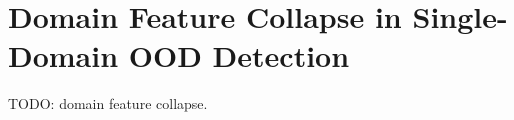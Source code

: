 \chapter{Domain Feature Collapse in Single-Domain OOD Detection}
\label{ch:domain-feature-collapse}

TODO: domain feature collapse.
